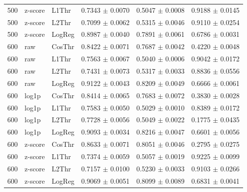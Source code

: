 \begin{longtable}{rllccc}
500 & z-score & L1Thr & 0.7343 $\pm$ 0.0070 & 0.5047 $\pm$ 0.0008 & 0.9188 $\pm$ 0.0145 \\
500 & z-score & L2Thr & 0.7099 $\pm$ 0.0062 & 0.5315 $\pm$ 0.0046 & 0.9110 $\pm$ 0.0254 \\
500 & z-score & LogReg & 0.8987 $\pm$ 0.0040 & 0.7891 $\pm$ 0.0061 & 0.6786 $\pm$ 0.0031 \\
600 & raw & CosThr & 0.8422 $\pm$ 0.0071 & 0.7687 $\pm$ 0.0042 & 0.4220 $\pm$ 0.0048 \\
600 & raw & L1Thr & 0.7563 $\pm$ 0.0067 & 0.5040 $\pm$ 0.0006 & 0.9042 $\pm$ 0.0172 \\
600 & raw & L2Thr & 0.7431 $\pm$ 0.0073 & 0.5317 $\pm$ 0.0033 & 0.8836 $\pm$ 0.0556 \\
600 & raw & LogReg & 0.9122 $\pm$ 0.0043 & 0.8209 $\pm$ 0.0049 & 0.6666 $\pm$ 0.0061 \\
600 & log1p & CosThr & 0.8414 $\pm$ 0.0065 & 0.7683 $\pm$ 0.0072 & 0.3830 $\pm$ 0.0028 \\
600 & log1p & L1Thr & 0.7583 $\pm$ 0.0050 & 0.5029 $\pm$ 0.0010 & 0.8389 $\pm$ 0.0172 \\
600 & log1p & L2Thr & 0.7728 $\pm$ 0.0056 & 0.5049 $\pm$ 0.0022 & 0.1775 $\pm$ 0.0435 \\
600 & log1p & LogReg & 0.9093 $\pm$ 0.0034 & 0.8216 $\pm$ 0.0047 & 0.6601 $\pm$ 0.0056 \\
600 & z-score & CosThr & 0.8633 $\pm$ 0.0071 & 0.8051 $\pm$ 0.0046 & 0.2795 $\pm$ 0.0275 \\
600 & z-score & L1Thr & 0.7374 $\pm$ 0.0059 & 0.5057 $\pm$ 0.0019 & 0.9225 $\pm$ 0.0099 \\
600 & z-score & L2Thr & 0.7157 $\pm$ 0.0100 & 0.5230 $\pm$ 0.0033 & 0.9103 $\pm$ 0.0266 \\
600 & z-score & LogReg & 0.9069 $\pm$ 0.0051 & 0.8099 $\pm$ 0.0089 & 0.6831 $\pm$ 0.0041 \\
\end{longtable}
